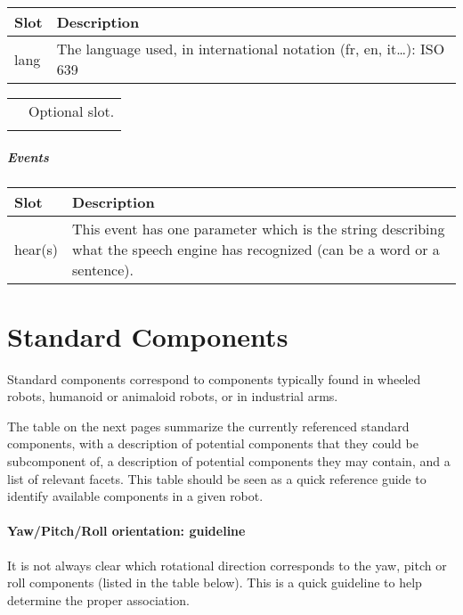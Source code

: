 \documentclass[a4paper]{article}
\begin{document}
\begin{flushleft}
\tablehead{}
\begin{supertabular}{|m{3.293cm}|m{11.997cm}|}
\hline
\sffamily\bfseries Slot &
\sffamily\bfseries Description\\\hline
lang &
\sffamily The language used, in international
notation (fr, en, it…): ISO 639\\\hline
\end{supertabular}
\end{flushleft}
\begin{flushleft}
\tablehead{}
\begin{supertabular}{|m{1.717cm}|m{10.464cm}}
\hhline{-~}
 &
\sffamily Optional slot.\\\hhline{-~}
\end{supertabular}
\end{flushleft}
\subparagraph{Events}

\begin{flushleft}
\tablehead{}
\begin{supertabular}{|m{3.293cm}|m{11.997cm}|}
\hline
\sffamily\bfseries Slot &
\sffamily\bfseries Description\\\hline
hear(s) &
\sffamily This event has one parameter which is
the string describing what the speech engine has recognized (can be a
word or a sentence).\\\hline
\end{supertabular}
\end{flushleft}
\section{Standard Components}

Standard components correspond to components typically found in wheeled
robots, humanoid or animaloid robots, or in industrial arms.


The table on the next pages summarize the currently referenced standard
components, with a description of potential components that they could
be subcomponent of, a description of potential components they may
contain, and a list of relevant facets. This table should be seen as a
quick reference guide to identify available components in a given
robot.

\paragraph{Yaw/Pitch/Roll orientation: guideline}


It is not always clear which rotational direction corresponds to the
yaw, pitch or roll components (listed in the table below). This is a
quick guideline to help determine the proper association.
\end{document}
